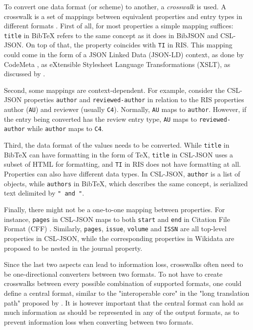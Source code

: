 \documentclass[fleqn,10pt,lineno]{wlpeerj} %
\begin{document}
To convert one data format (or scheme) to another, a \emph{crosswalk} is used. A crosswalk is a set of mappings between equivalent properties and entry types in different formats \citep{pierre_issues_1998}. First of all, for most properties a simple mapping suffices: \texttt{title} in BibTeX refers to the same concept as it does in BibJSON and CSL-JSON. On top of that, the property coincides with \texttt{TI} in RIS. This mapping could come in the form of a JSON Linked Data (JSON-LD) context, as done by CodeMeta \citep{jones_codemeta:_2017}, as eXtensible Stylesheet Language Transformations (XSLT), as discussed by \cite{godby_two_2003}.

Second, some mappings are context-dependent. For example, consider the CSL-JSON properties \texttt{author} and \texttt{reviewed-author} in relation to the RIS properties author (\texttt{AU}) and reviewer (usually \texttt{C4}). Normally, \texttt{AU} maps to \texttt{author}. However, if the entry being converted has the review entry type, \texttt{AU} maps to \texttt{reviewed-author} while \texttt{author} maps to \texttt{C4}.

Third, the data format of the values needs to be converted. While \texttt{title} in BibTeX can have formatting in the form of \TeX, \texttt{title} in CSL-JSON uses a subset of HTML for formatting, and \texttt{TI} in RIS does not have formatting at all. Properties can also have different data types. In CSL-JSON, \texttt{author} is a list of objects, while \texttt{authors} in BibTeX, which describes the same concept, is serialized text delimited by \texttt{" and "}.

Finally, there might not be a one-to-one mapping between properties. For instance, \texttt{pages} in CSL-JSON maps to both \texttt{start} and \texttt{end} in Citation File Format (CFF) \citep{druskat_citation_2018}. Similarly, \texttt{pages}, \texttt{issue}, \texttt{volume} and \texttt{ISSN} are all top-level properties in CSL-JSON, while the corresponding properties in Wikidata are proposed to be nested in the journal property.

Since the last two aspects can lead to information loss, crosswalks often need to be one-directional converters between two formats. To not have to create crosswalks between every possible combination of supported formats, one could define a central format, similar to the "interoperable core" in the "long translation path" proposed by \cite{godby_two_2003}. It is however important that the central format can hold as much information as should be represented in any of the output formats, as to prevent information loss when converting between two formats.
\end{document}
